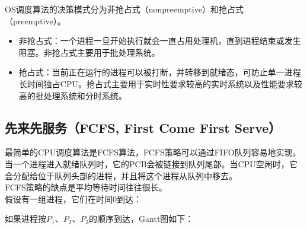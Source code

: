 OS调度算法的决策模式分为非抢占式（nonpreemptive）和抢占式（preemptive）。

\begin{itemize}
    \item 非抢占式：一个进程一旦开始执行就会一直占用处理机，直到进程结束或发生阻塞。非抢占式主要用于批处理系统。

    \item 抢占式：当前正在运行的进程可以被打断，并转移到就绪态，可防止单一进程长时间独占CPU。抢占式主要用于实时性要求较高的实时系统以及性能要求较高的批处理系统和分时系统。
\end{itemize}

\vspace{0.5cm}

\subsection{先来先服务（FCFS, First Come First Serve）}

最简单的CPU调度算法是FCFS算法，FCFS策略可以通过FIFO队列容易地实现。当一个进程进入就绪队列时，它的PCB会被链接到队列尾部。当CPU空闲时，它会分配给位于队列头部的进程，并且将这个进程从队列中移去。\\

FCFS策略的缺点是平均等待时间往往很长。\\

假设有一组进程，它们在时间0到达：

\begin{table}[H]
    \centering
\end{table}

如果进程按$ P_1 $、$ P_2 $、$ P_3 $的顺序到达，Gantt图如下：

\begin{figure}[H]
    \centering
\end{figure}


